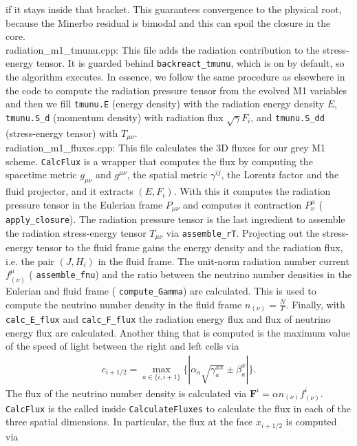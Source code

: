 \documentclass{article}
\newcommand{\var}[1]{%
  {\setlength{\fboxsep}{1.5pt}%
   \colorbox{varbg}{\textcolor{varfg}{\texttt{\small #1}}}}}
\begin{document}
if it stays inside that bracket. This guarantees convergence to the physical root, because the Minerbo residual is bimodal and this can spoil the closure in the
core.\\
{\color{gray}radiation\_m1\_tmunu.cpp:} This file adds the radiation contribution to the stress-energy tensor. It is guarded behind \var{backreact\_tmunu}, which is on
by default, so the algorithm executes. In essence, we follow the same procedure as elsewhere in the code to compute the radiation pressure tensor from the evolved M1
variables and then we fill \var{tmunu.E} (energy density) with the radiation energy density $E$, \var{tmunu.S\_d} (momentum density) with radiation flux $\sqrt{\gamma}F_i$, and
\var{tmunu.S\_dd} (stress-energy tensor) with $T_{\mu\nu}$.\\
{\color{gray}radiation\_m1\_fluxes.cpp:} This file calculates the 3D fluxes for our grey M1 scheme. \var{CalcFlux} is a wrapper that computes the flux by computing the spacetime
metric $g_{\mu\nu}$ and $g^{\mu\nu}$, the spatial metric $\gamma^{ij}$, the Lorentz factor and the fluid projector, and it extracts $(E,F_i)$. With this it computes the radiation
pressure tensor in the Eulerian frame $P_{\mu\nu}$ and computes it contraction $P^{\mu}_{\nu}$ (\var{apply\_closure}). The radiation pressure tensor is the
last ingredient to assemble the radiation stress-energy tensor $T_{\mu\nu}$ via \var{assemble\_rT}. Projecting out the stress-energy tensor to the fluid frame gains
the energy density and the radiation flux, i.e. the pair $(J,H_i)$ in the fluid frame. The unit-norm radiation number current $f^{\mu}_{(\nu)}$ (\var{assemble\_fnu}) and the ratio between the neutrino number
densities in the Eulerian and fluid frame (\var{compute\_Gamma}) are calculated. This is used to compute the neutrino number density in the fluid frame $n_{(\nu)}=\frac{N}{\Gamma}$. Finally, with \var{calc\_E\_flux} and
\var{calc\_F\_flux} the radiation energy flux and flux of neutrino energy flux are calculated. Another thing that is computed is the maximum value of the speed of light between the right and left cells via
\begin{align}
  c_{i+1/2}=\max_{a\in\{i,i+1\}}{\{|\alpha_a\sqrt{\gamma_a^{xx}}\pm \beta^x_a|\}}.
\end{align}
The flux of the neutrino number density is calculated via
$\mathbf{F}^i=\alpha n_{(\nu)}f^i_{(\nu)}$. \var{CalcFlux} is the called inside \var{CalculateFluxes} to calculate the flux in each of the three spatial dimensions. In particular, the flux at the face $x_{i+1/2}$ is computed via
\end{document}
